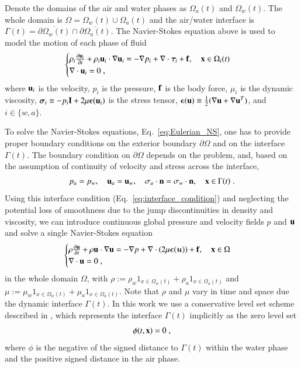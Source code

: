 \documentclass[final,3p,times]{elsarticle}
\begin{document}
Denote the domains of the air and water phases as 
$\Omega_a(t)$ and $\Omega_w(t)$. The whole domain is $\Omega = \Omega_w(t)\cup\Omega_a(t)$ and the air/water interface is $\Gamma(t) = \overline{\partial\Omega_w(t)}\cap \overline{\partial\Omega_a(t)}$. 
The Navier-Stokes equation above is used to model the motion of each phase of fluid
\begin{align}
   \begin{cases}
      \rho_i\frac{\partial \mathbf{u}_i}{\partial t} + \rho_i \mathbf{u}_i\cdot\nabla\mathbf{u}_i = -\nabla p_i + \nabla\cdot \bm{\tau}_i+\mathbf{f},\quad \mathbf{x}\in\Omega_i(t)\\
      \nabla\cdot\mathbf{u}_i = 0 \; ,
   \end{cases}\label{eq:Eulerian_NS}
\end{align}
where $\mathbf{u}_i$ is the velocity, $p_i$ is the pressure, $\mathbf{f}$ is the body force, 
$\mu_i$ is the dynamic viscosity, $\bm{\sigma}_i \equiv -p_i\mathbf{I}+ 2\mu\bm{\epsilon}(\mathbf{u}_i)$ is the stress tensor, 
$\bm{\epsilon}(\mathbf{u})\equiv \frac{1}{2}(\nabla\mathbf{u}+\nabla\mathbf{u}^T)$, 
and $i\in \{w,a\}$. 

To solve the Navier-Stokes equations, Eq.~\eqref{eq:Eulerian_NS}, 
one has to provide proper boundary conditions on the exterior boundary $\partial\Omega$ and on the interface 
$\Gamma(t)$. The boundary condition on $\partial\Omega$
depends on the problem, and, based on the assumption of continuity of velocity and stress across the interface, 
\begin{align}
\label{eq:interface_condition}
   p_a = p_w, \quad \mathbf{u}_a = \mathbf{u}_w, \quad {\bf\sigma}_a \cdot \mathbf{n} = {\bf\sigma}_w \cdot \mathbf{n},\quad \mathbf{x}\in\Gamma(t) \; .
\end{align}
Using this interface condition (Eq.~\eqref{eq:interface_condition}) and neglecting the potential loss of smoothness due to the jump discontinuities in density and viscosity, we can introduce continuous global pressure and velocity fields $p$ and $\mathbf{u}$ and solve a single Navier-Stokes equation
\begin{align*}
   \begin{cases}
      \rho\frac{\partial \mathbf{u}}{\partial t} + \rho\mathbf{u}\cdot\nabla\mathbf{u} = -\nabla p + \nabla\cdot (2\mu\bm{\epsilon}(\bm u))+\mathbf{f},\quad \mathbf{x}\in\Omega\\
      \nabla\cdot\mathbf{u} = 0 \; ,
   \end{cases}
\end{align*}
in the whole domain $\Omega$, with $\rho := \rho_w 1_{x\in\Omega_w(t)}+\rho_a 1_{x\in\Omega_a(t)}$ and 
   $\mu := \mu_w 1_{x\in\Omega_w(t)}+\mu_a 1_{x\in\Omega_a(t)}$. Note that $\rho$ and $\mu$ vary in time and space due the dynamic interface $\Gamma(t)$. In this work we use a conservative level set scheme described in \cite{KAFB11}, which represents the interface $\Gamma(t)$ implicitly as the zero level set
\begin{equation}
\phi(t,\mathbf{x}) = 0 \; ,
\end{equation}
where $\phi$ is the negative of the signed distance to $\Gamma(t)$ within the water phase and the positive signed distance in the air phase.
\end{document}
